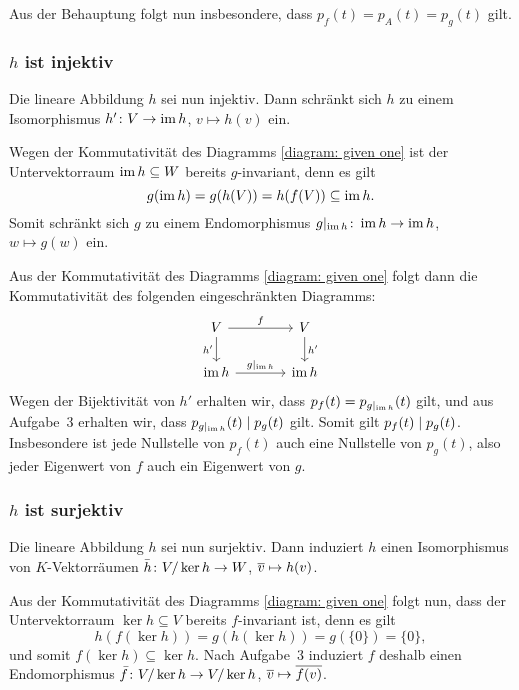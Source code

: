 Aus der Behauptung folgt nun insbesondere, dass $p_f(t) = p_A(t) = p_g(t)$ gilt.



\subsubsection{\texorpdfstring{$h$}{h} ist injektiv}

Die lineare Abbildung $h$ sei nun injektiv.
Dann schränkt sich $h$ zu einem Isomorphismus $h' \colon V \to \operatorname{im} h$, $v \mapsto h(v)$ ein.

Wegen der Kommutativität des Diagramms \eqref{diagram: given one} ist der Untervektorraum $\operatorname{im} h \subseteq W$ bereits $g$-invariant, denn es gilt
\[
            g(\operatorname{im} h)
  =         g(h(V))
  =         h(f(V))
  \subseteq \operatorname{im} h.
\]
Somit schränkt sich $g$ zu einem Endomorphismus $g|_{\operatorname{im} h} \colon \operatorname{im} h \to \operatorname{im} h$, $w \mapsto g(w)$ ein.

Aus der Kommutativität des Diagramms \eqref{diagram: given one} folgt dann die Kommutativität des folgenden eingeschränkten Diagramms:
\[
  \begin{tikzcd}[column sep = large]
      V
      \arrow{r}{f}
      \arrow[swap]{d}{h'}
    & V
      \arrow{d}{h'}
    \\
      \im h
      \arrow{r}{g|_{\im h}}
    & \im h
  \end{tikzcd}
\]
Wegen der Bijektivität von $h'$ erhalten wir, dass $p_f(t) = p_{g|_{\operatorname{im} h}}(t)$ gilt, und aus Aufgabe~3 erhalten wir, dass $p_{g|_{\operatorname{im} h}}(t) \mathrel{|} p_g(t)$ gilt.
Somit gilt $p_f(t) \mathrel{|} p_g(t)$.
Insbesondere ist jede Nullstelle von $p_f(t)$ auch eine Nullstelle von $p_g(t)$, also jeder Eigenwert von $f$ auch ein Eigenwert von $g$.



\subsubsection*{\texorpdfstring{$h$}{h} ist surjektiv}

Die lineare Abbildung $h$ sei nun surjektiv.
Dann induziert $h$ einen Isomorphismus von $K$-Vektorräumen $\bar{h} \colon V/\ker h \to W$, $\overline{v} \mapsto h(v)$.

Aus der Kommutativität des Diagramms \eqref{diagram: given one} folgt nun, dass der Untervektorraum $\ker h \subseteq V$ bereits $f$-invariant ist, denn es gilt
\[
    h(f(\ker h))
  = g(h(\ker h))
  = g(\{0\})
  = \{0\},
\]
und somit $f(\ker h) \subseteq \ker h$.
Nach Aufgabe~3 induziert $f$ deshalb einen Endomorphismus $\bar{f} \colon V/\ker h \to V/\ker h$, $\overline{v} \mapsto \overline{f(v)}$.

